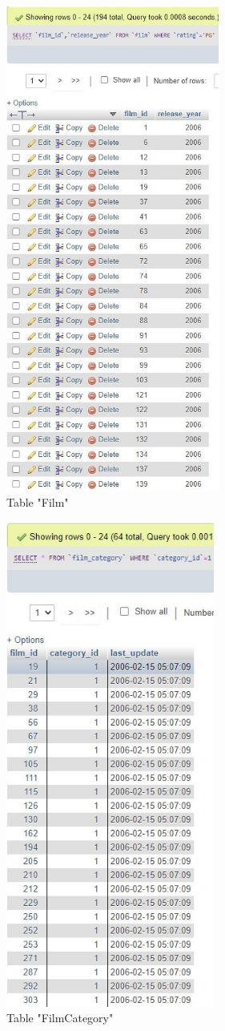 \documentclass{article}
\begin{document}
		\begin{figure}[H]
			\includegraphics[height = 16cm]{film_selectwhere}
			\caption{Table "Film"}
		\end{figure}
		\begin{figure}[H]
			\includegraphics[height = 16cm]{filmcategory_selectwhere}
			\caption{Table "Film\textunderscore Category"}
		\end{figure}
\end{document}
